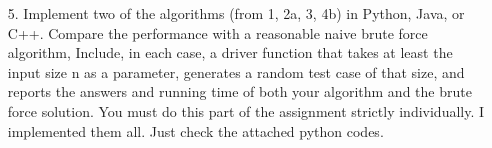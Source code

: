 \documentclass{article}       %
\begin{document}
\begin{enumerate}
	\item[5.] Implement two of the algorithms (from 1, 2a, 3, 4b) in Python, Java, or C++. Compare the performance with a reasonable naive brute force algorithm, Include, in each case, a driver function that takes at least the input size n as a parameter, generates a random test case of that size, and reports the answers and running time of both your algorithm and the brute force solution. You must do this part of the assignment strictly individually.\newline\newline
	I implemented them all. Just check the attached python codes.
\end{enumerate}  
\end{document}
